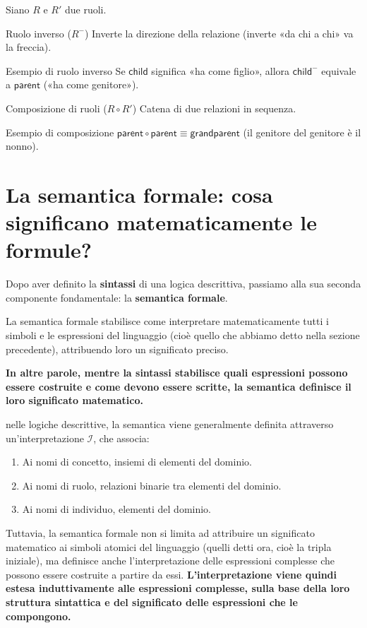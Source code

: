 Siano \(R\) e \(R'\) due ruoli.

\begin{definition}{Ruolo inverso (\(R^{-}\))}
    Inverte la direzione della relazione (inverte «da chi a chi» va la freccia).
\end{definition}
\begin{observation}{Esempio di ruolo inverso}
    Se \(\mathsf{child}\) significa «ha come figlio», allora
    \(\mathsf{child}^{-}\) equivale a \(\mathsf{parent}\) («ha come
    genitore»).
\end{observation}

\begin{definition}{Composizione di ruoli (\(R\circ R'\))}
    Catena di due relazioni in sequenza.
\end{definition}
\begin{observation}{Esempio di composizione}
    \(\mathsf{parent}\circ\mathsf{parent}\equiv\mathsf{grandparent}\)
    (il genitore del genitore è il nonno).
\end{observation}


\section{La semantica formale: cosa significano matematicamente le formule?}

Dopo aver definito la \textbf{sintassi} di una logica descrittiva, passiamo alla sua seconda componente fondamentale: la \textbf{semantica formale}.

La semantica formale stabilisce come interpretare matematicamente tutti i simboli e le espressioni del linguaggio (cioè quello che abbiamo detto nella sezione precedente), attribuendo loro un significato preciso.

\textbf{In altre parole, mentre la sintassi stabilisce quali espressioni possono essere costruite e come devono essere scritte, la semantica definisce il loro significato matematico.}

\begin{observation}{}
    nelle logiche descrittive, la semantica viene generalmente definita attraverso un'interpretazione \(\mathcal{I}\), che associa:
    \begin{enumerate}
        \item Ai nomi di concetto, insiemi di elementi del dominio.
        \item Ai nomi di ruolo, relazioni binarie tra elementi del dominio.
        \item Ai nomi di individuo, elementi del dominio.
    \end{enumerate}
Tuttavia, la semantica formale non si limita ad attribuire un significato matematico ai simboli atomici del linguaggio (quelli detti ora, cioè la tripla iniziale), ma definisce anche l'interpretazione delle espressioni complesse che possono essere costruite a partire da essi.
\textbf{L'interpretazione viene quindi estesa induttivamente alle espressioni complesse, sulla base della loro struttura sintattica e del significato delle espressioni che le compongono.}
\end{observation}

